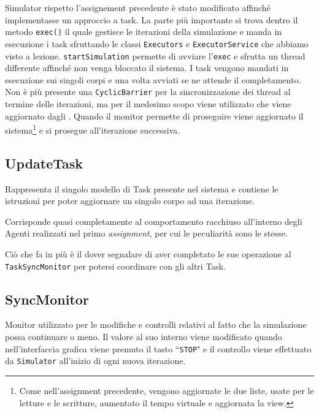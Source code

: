 Simulator rispetto l'assignement precedente è stato modificato affinché implementasse un approccio a task. La parte più importante si trova dentro il metodo \texttt{exec()} il quale gestisce le iterazioni della simulazione e manda in esecuzione i task sfruttando le classi \texttt{Executors} e \texttt{ExecutorService} che abbiamo visto a lezione. \texttt{startSimulation} permette di avviare l'\texttt{exec} e sfrutta un thread differente affinché non venga bloccato il sistema.
\newline
I task vengono mandati in esecuzione sui singoli corpi e una volta avviati se ne attende il completamento.
\newline
Non è più presente una \texttt{CyclicBarrier} per la sincronizzazione dei thread al termine delle iterazioni, ma per il medesimo scopo viene utilizzato \texttt{} che viene aggiornato dagli \texttt{}. Quando il monitor permette di proseguire viene aggiornato il sistema\footnote{Come nell'assignment precedente, vengono aggiornate le due liste, usate per le letture e le scritture, aumentato il tempo virtuale e aggiornata la view.} e si prosegue all'iterazione successiva.

\subsection{UpdateTask}
\label{subs:update_task}

Rappresenta il singolo modello di Task presente nel sistema e contiene le istruzioni per poter aggiornare un singolo corpo ad una iterazione.

Corrisponde quasi completamente al comportamento racchiuso all'interno degli Agenti realizzati nel primo \textit{assignment}, per cui le peculiarità sono le stesse.

Ciò che fa in più è il dover segnalare di aver completato le sue operazione al \texttt{TaskSyncMonitor} per potersi coordinare con gli altri Task.

\subsection{SyncMonitor}
\label{subs:sync_m}

Monitor utilizzato per le modifiche e controlli relativi al fatto che la simulazione possa continuare o meno. Il valore al suo interno viene modificato quando nell'interfaccia grafica viene premuto il tasto ``\texttt{STOP}" e il controllo viene effettuato da \texttt{Simulator} all'inizio di ogni nuova iterazione.

